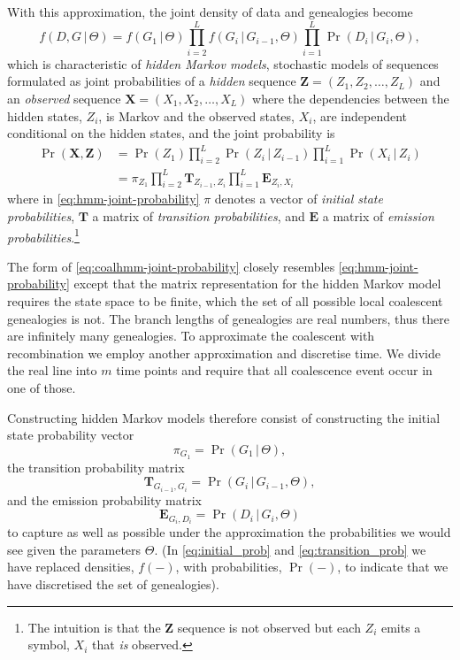 \documentclass[graybox]{svmult}
\newcommand{\G}{\ensuremath{G}}
\renewcommand{\D}{\ensuremath{D}}
\newcommand{\T}{\ensuremath{\mathbf{T}}}
\renewcommand{\E}{\ensuremath{\mathbf{E}}}
\begin{document}
With this approximation, the joint density of data and genealogies become
\begin{equation}
  \label{eq:coalhmm-joint-probability}
  f(\D,\G\,|\,\Theta) = 
  	f(\G_1\,|\,\Theta)
  	\prod_{i=2}^{L}f(\G_{i}\,|\,\G_{i-1},\Theta)
  	\prod_{i=1}^L \Pr(\D_i\,|\,\G_i,\Theta)
  	,
\end{equation}
which is characteristic of \emph{hidden Markov models}, stochastic models of sequences formulated as joint probabilities of a \emph{hidden} sequence $\mathbf{Z}=(Z_1,Z_2,\ldots,Z_L)$ and an \emph{observed} sequence $\mathbf{X}=(X_1,X_2,\ldots,X_L)$ where the dependencies between the hidden states, $Z_i$, is Markov and the observed states, $X_i$, are independent conditional on the hidden states, and the joint probability is
\begin{align}
  \Pr(\mathbf{X},\mathbf{Z})
    &= 
  	\Pr(Z_1)
  	\prod_{i=2}^{L}\Pr(Z_{i}\,|\,Z_{i-1})
  	\prod_{i=1}^L \Pr(X_i\,|\,Z_i)
  	\\
    \label{eq:hmm-joint-probability}
  	&=
  	\pi_{Z_1}
  	\prod_{i=2}^{L}\T_{Z_{i-1},Z_{i}}
  	\prod_{i=1}^L  \E_{Z_i,X_i}
\end{align}
where in \eqref{eq:hmm-joint-probability} $\pi$ denotes a vector of \emph{initial state probabilities}, $\T$ a matrix of \emph{transition probabilities}, and $\E$ a matrix of \emph{emission probabilities}.\footnote{The intuition is that the $\mathbf{Z}$ sequence is not observed but each $Z_i$ emits a symbol, $X_i$ that \emph{is} observed.}

The form of \eqref{eq:coalhmm-joint-probability} closely resembles \eqref{eq:hmm-joint-probability} except that the matrix representation for the hidden Markov model requires the state space to be finite, which the set of all possible local coalescent genealogies is not. The branch lengths of genealogies are real numbers, thus there are infinitely many genealogies. To approximate the coalescent with recombination we employ another approximation and discretise time. We divide the real line into $m$ time points and require that all coalescence event occur in one of those.

Constructing hidden Markov models therefore consist of constructing the initial state probability vector
\begin{equation}
  \label{eq:initial_prob}
  \pi_{\G_1} = \Pr(\G_1\,|\,\Theta),
\end{equation}
the transition probability matrix
\begin{equation}
  \label{eq:transition_prob}
  \T_{\G_{i-1},\G_i} = \Pr(\G_i\,|\,\G_{i-1},\Theta),
\end{equation}
and the emission probability matrix
\begin{equation}
  \E_{\G_i,\D_i} = \Pr(\D_i\,|\,\G_i,\Theta)
\end{equation}
to capture as well as possible under the approximation the probabilities we would see given the parameters $\Theta$. (In \eqref{eq:initial_prob} and \eqref{eq:transition_prob} we have replaced densities, $f(-)$, with probabilities, $\Pr(-)$, to indicate that we have discretised the set of genealogies).
\end{document}
